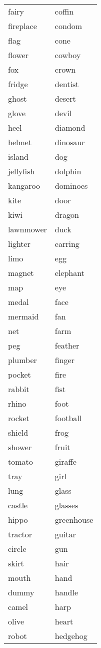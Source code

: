 \documentclass[
  man,floatsintext]{apa6}
\begin{document}
\begin{longtable}{ll}
fairy & coffin\\
fireplace & condom\\
flag & cone\\
\addlinespace
flower & cowboy\\
fox & crown\\
fridge & dentist\\
ghost & desert\\
glove & devil\\
\addlinespace
heel & diamond\\
helmet & dinosaur\\
island & dog\\
jellyfish & dolphin\\
kangaroo & dominoes\\
\addlinespace
kite & door\\
kiwi & dragon\\
lawnmower & duck\\
lighter & earring\\
limo & egg\\
\addlinespace
magnet & elephant\\
map & eye\\
medal & face\\
mermaid & fan\\
net & farm\\
\addlinespace
peg & feather\\
plumber & finger\\
pocket & fire\\
rabbit & fist\\
rhino & foot\\
\addlinespace
rocket & football\\
shield & frog\\
shower & fruit\\
tomato & giraffe\\
tray & girl\\
\addlinespace
lung & glass\\
castle & glasses\\
hippo & greenhouse\\
tractor & guitar\\
circle & gun\\
\addlinespace
skirt & hair\\
mouth & hand\\
dummy & handle\\
camel & harp\\
olive & heart\\
\addlinespace
robot & hedgehog\\

\end{longtable}
\end{document}
